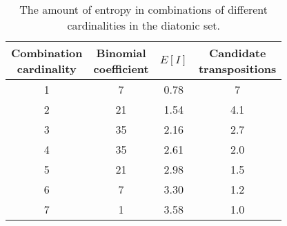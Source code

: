 \begin{table}[htbp]
    \centering
    \caption{The amount of entropy in combinations of different cardinalities in the diatonic set.}
    \label{tab:entropy-diatonic}
    \begin{tabular}{c c c c}
        \toprule
            \makecell{Combination\\cardinality} &
            \makecell{Binomial\\coefficient} &
            $E[I]$ &
            \makecell{Candidate\\transpositions} \\
        \midrule
            1 & 7  & 0.78 & 7   \\
            2 & 21 & 1.54 & 4.1 \\
            3 & 35 & 2.16 & 2.7 \\
            4 & 35 & 2.61 & 2.0 \\
            5 & 21 & 2.98 & 1.5 \\
            6 & 7  & 3.30 & 1.2 \\
            7 & 1  & 3.58 & 1.0 \\
        \bottomrule
    \end{tabular}
\end{table}